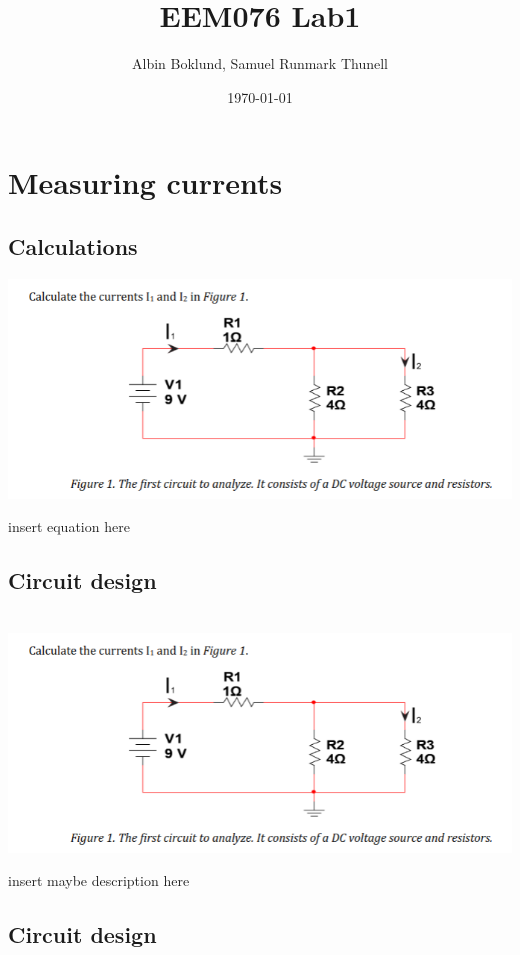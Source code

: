 \documentclass[11pt]{article}
\title{ EEM076 Lab1 }
\author{ Albin Boklund, Samuel Runmark Thunell }
\date{\today}
\begin{document}
\maketitle

\pagebreak


\section{\bf{Measuring currents}}

\subsection[25pt]{\bf{Calculations}}

\includegraphics[width=\linewidth]{1.1 calculation.png}


\noindent
insert equation here

\subsection[25pt]{\bf{Circuit design}}

\noindent
\\
\includegraphics[width=\linewidth]{1.1 calculation.png}

insert maybe description here

\subsection[25pt]{\bf{Circuit design}}
\end{document}
